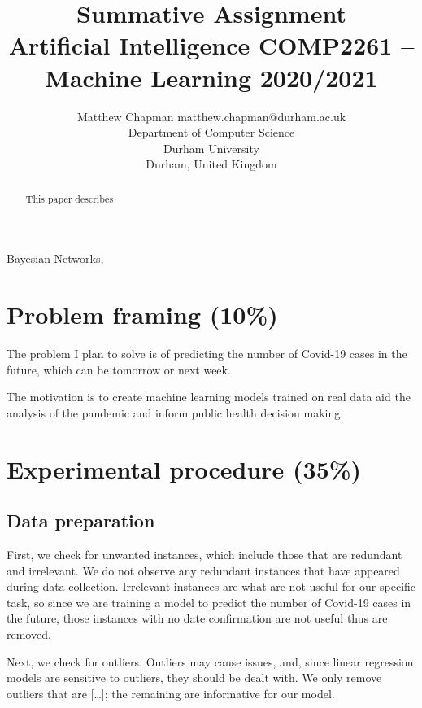 \documentclass[twoside,11pt]{article}
\begin{document}
\title{Summative Assignment\\ 
Artificial Intelligence COMP2261 –\\
Machine Learning 2020/2021}

\author{\name Matthew Chapman \email matthew.chapman@durham.ac.uk \\
       \addr Department of Computer Science\\
       Durham University\\
       Durham, United Kingdom}

\maketitle

\begin{abstract}%
This paper describes
\end{abstract}

\begin{keywords}
  Bayesian Networks,
\end{keywords}

\cite{kramer1991nonlinear}

\section{Problem framing (10\%)}
The problem I plan to solve is of predicting the number of Covid-19 cases in the future, which can be tomorrow or next week. 

The motivation is to create machine learning models trained on real data aid the analysis of the pandemic and inform public health decision making.   

\section{Experimental procedure (35\%)}
\subsection{Data preparation}
First, we check for unwanted instances, which include those that are redundant and irrelevant. We do not observe any redundant instances that have appeared during data collection. Irrelevant instances are what are not useful for our specific task, so since we are training a model to predict the number of Covid-19 cases in the future, those instances with no date confirmation are not useful thus are removed.

Next, we check for outliers. Outliers may cause issues, and, since linear regression models are sensitive to outliers, they should be dealt with. We only remove outliers that are [\dots]; the remaining are informative for our model. 
\end{document}

